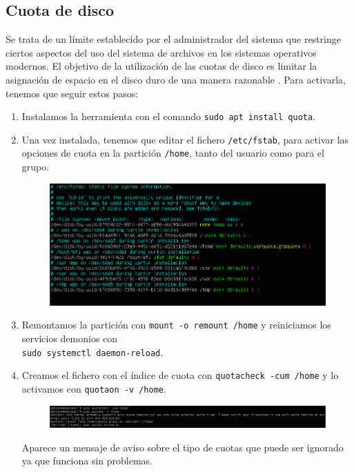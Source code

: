 \documentclass[10pt]{article}
\begin{document}
	\subsection{Cuota de disco}
	Se trata de un límite establecido por el administrador del sistema que restringe ciertos aspectos del uso del sistema de archivos en los sistemas operativos modernos. El objetivo de la utilización de las cuotas de disco es limitar la asignación de espacio en el disco duro de una manera razonable \cite{quota}. Para activarla, tenemos que seguir estos pasos\cite{disk_quota}:
	\begin{enumerate}
		\item Instalamos la herramienta con el comando \verb|sudo apt install quota|.
		\item Una vez instalada, tenemos que editar el fichero \verb|/etc/fstab|, para activar las opciones de cuota en la partición \verb|/home|, tanto del usuario como para el grupo.
		\begin{figure}[H]
			\setlength{\abovecaptionskip}{0cm}
			\setlength{\belowcaptionskip}{0cm}
			\centering
			\includegraphics[width=0.7\linewidth]{Recursos/fstabQuota.png}
		\end{figure}
		\item Remontamos la partición con \verb|mount -o remount /home| y reiniciamos los servicios demonios con \\ \verb|sudo systemctl daemon-reload|.
		\item Creamos el fichero con el índice de cuota con \verb|quotacheck -cum /home| y lo activamos con \verb|quotaon -v /home|.
		\begin{figure}[H]
			\setlength{\abovecaptionskip}{0cm}
			\setlength{\belowcaptionskip}{0cm}
			\centering
			\includegraphics[width=\linewidth]{Recursos/quotaOn.png}
		\end{figure}
		Aparece un mensaje de aviso sobre el tipo de cuotas que puede ser ignorado ya que funciona sin problemas.

\end{enumerate}
\end{document}

